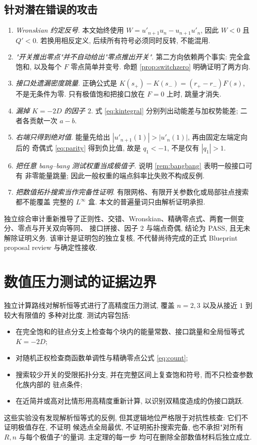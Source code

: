 \documentclass[UTF8]{ctexart}
\begin{document}
\subsection{针对潜在错误的攻击}

\begin{enumerate}
	\item \emph{Wronskian 约定反号}. 本文始终使用 $W=u'_{n+1}u_n-u_{n+1}u'_n$, 因此 $W<0$
		且 $Q'<0$. 若换用相反定义, 后续所有符号必须同时反转, 不能混用.
	\item \emph{"开关推出零点"并不自动给出"零点推出开关"}. 第二方向依赖两个事实: 完全盒饱和,
		以及每个 $F$ 零点简单并变号. 命题 \ref{prop:switchzero} 明确证明了两方向.
	\item \emph{接口处遗漏密度跳量}. 正确公式是 $K(s_+)-K(s_-)=(r_+-r_-)F(s)$, 不是无条件为零.
		只有极值饱和把接口放在 $F=0$ 上时, 跳量才消失.
	\item \emph{漏掉 $K=-2D$ 的因子 $2$}. 式 \eqref{eq:kintegral} 分别列出动能差与加权势能差;
		二者各贡献一次 $a-b$.
	\item \emph{右端只得到绝对值}. 能量先给出 $|u'_{n+1}(1)|>|u'_n(1)|$, 再由固定左端定向后的
		奇偶式 \eqref{eq:parity} 得到负比值, 故是 $q_1<-1$, 不是仅有 $|q_1|>1$.
	\item \emph{把任意 bang--bang 测试权重当成极值子}. 说明 \ref{rem:bangbang} 表明一般接口可有
		非零能量跳量; 因此一般权重的端点斜率比失败不构成反例.
	\item \emph{把数值拓扑搜索当作完备性证明}. 有限网格、有限开关参数化或局部驻点搜索都不能覆盖
		完整的 $L^\infty$ 盒. 本文的普遍量词只由解析证明承担.
\end{enumerate}

独立综合审计重新推导了正则性、交错、Wronskian、精确零点式、两套一侧变分、零点与开关双向等同、
接口拼接、因子 $2$ 与端点奇偶, 结论为 PASS, 且无未解除证明义务. 该审计是证明包的独立复核,
不代替尚待完成的正式 Blueprint proposal review 与确定性接收.

\section{数值压力测试的证据边界}

独立计算路线对解析恒等式进行了高精度压力测试, 覆盖 $n=2,3$ 以及从接近 $1$ 到较大有限值的
多种对比度. 测试内容包括:
\begin{itemize}
	\item 在完全饱和的驻点分支上检查每个块内的能量常数、接口跳量和全局恒等式 $K=-2D$;
	\item 对随机正权检查商函数单调性与精确零点公式 \eqref{eq:count};
	\item 搜索较少开关的受限拓扑分支, 并在完整区间上复查饱和符号, 而不只检查参数化族内部的
		驻点条件;
	\item 在近简并或高对比情形用高精度重新计算, 以识别双精度造成的伪接口跳跃.
\end{itemize}
这些实验没有发现解析恒等式的反例, 但其逻辑地位严格限于对抗性核查: 它们不证明极值存在, 不证明
候选点全局最优, 不证明拓扑搜索完备, 也不承担"对所有 $R,n$ 与每个极值子"的量词. 主定理的每一步
均可在删除全部数值材料后独立成立.
\end{document}
